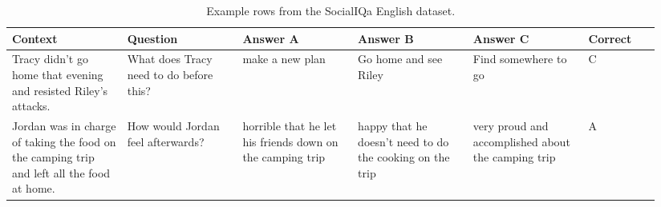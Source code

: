\begin{table}[!ht]
\footnotesize
\caption{Example rows from the SocialIQa English dataset.}\label{table:SocialIQa}
    \centering
    \begin{tabular}{|p{0.167\linewidth}|p{0.167\linewidth}|p{0.167\linewidth}|p{0.167\linewidth}|p{0.167\linewidth}|p{0.1\linewidth}|}
    \hline
    {\bfseries Context} & {\bfseries Question} & {\bfseries Answer A} & {\bfseries Answer B} & {\bfseries Answer C} & {\bfseries Correct} \\
    \hline
    Tracy didn't go home that evening and resisted Riley's attacks. & What does Tracy need to do before this? & make a new plan & Go home and see Riley & Find somewhere to go & C \\
    Jordan was in charge of taking the food on the camping trip and left all the food at home. & How would Jordan feel afterwards?& horrible that he let his friends down on the camping trip & happy that he doesn't need to do the cooking on the trip & very proud and accomplished about the camping trip & A \\
    \hline
    \end{tabular}
\end{table}